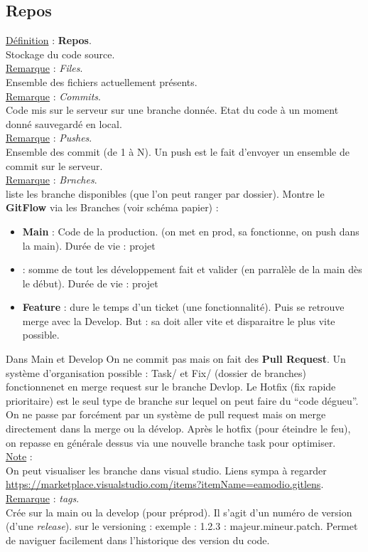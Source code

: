 \documentclass[a4paper,12pt,twoside]{article}
\newcommand{\rem}[2]{\noindent\underline{Remarque} : \textit{#1}.\\ \indent #2}
\newcommand{\note}[1]{\noindent\underline{Note} : \\ \indent #1}
\newcommand{\defi}[2]{\noindent\underline{Définition} : \textbf{#1}.\\ \indent #2}
\begin{document}
\subsection{Repos}

\defi{Repos}{Stockage du code source.}\\

\rem{Files}{Ensemble des fichiers actuellement présents.}\\

\rem{Commits}{Code mis sur le serveur sur une branche donnée. Etat du code à un moment donné sauvegardé en local.}\\

\rem{Pushes}{Ensemble des commit (de 1 à N). Un push est le fait d'envoyer un ensemble de commit sur le serveur.}\\

\rem{Brnches}{liste les branche disponibles (que l'on peut ranger par dossier). Montre le \textbf{GitFlow} via les Branches (voir schéma papier) :
\begin{itemize}  
\item \textbf{Main} : Code de la production. (on met en prod, sa fonctionne, on push dans la main). Durée de vie : projet
\item \tetbf{Develop} : somme de tout les développement fait et valider (en parralèle de la main dès le début). Durée de vie : projet
\item \textbf{Feature} : dure le temps d'un ticket (une fonctionnalité). Puis se retrouve merge avec la Develop. But : sa doit aller vite et disparaitre le plus vite possible.
\end{itemize}
Dans Main et Develop On ne commit pas mais on fait des \textbf{Pull Request}. Un système d'organisation possible : Task/ et Fix/ (dossier de branches) fonctionnenet en merge request sur le branche Devlop. Le Hotfix (fix rapide prioritaire) est le seul type de branche sur lequel on peut faire du ``code dégueu''. On ne passe par forcément par un système de pull request mais on merge directement dans la merge ou la dévelop. Après le hotfix (pour éteindre le feu), on repasse en générale dessus via une nouvelle branche task pour optimiser.\\
}

\note{On peut visualiser les branche dans visual studio. Liens sympa à regarder \url{https://marketplace.visualstudio.com/items?itemName=eamodio.gitlens}.}\\

\rem{tags}{Crée sur la main ou la develop (pour préprod). Il s'agit d'un numéro de version (d'une \textit{release}). sur le versioning : exemple : 1.2.3 : majeur.mineur.patch. Permet de naviguer facilement dans l'historique des version du code.}\\
\end{document}
